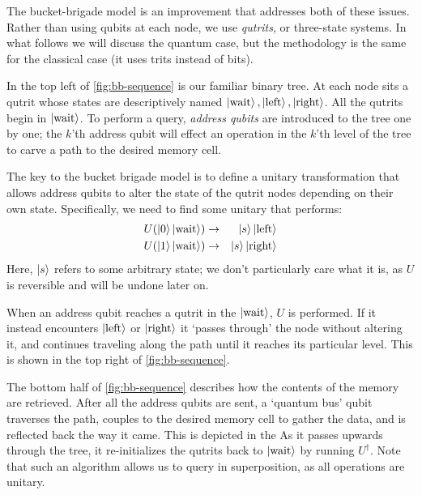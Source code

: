 \documentclass[a4paper,12pt]{article}
\begin{document}
{{The bucket-brigade model is an improvement that addresses both of these issues. Rather than using qubits at each node, we use \emph{qutrits}, or three-state systems. In what follows we will discuss the quantum case, but the methodology is the same for the classical case (it uses trits instead of bits).

In the top left of \autoref{fig:bb-sequence} is our familiar binary tree. At each node sits a qutrit whose states are descriptively named $\ket{\hbox{wait}}, \ket{\hbox{left}}, \ket{\hbox{right}}$. All the qutrits begin in $\ket{\hbox{wait}}$. To perform a query, \emph{address qubits} are introduced to the tree one by one; the $k$'th address qubit will effect an operation in the $k$'th level of the tree to carve a path to the desired memory cell.

The key to the bucket brigade model is to define a unitary transformation that allows address qubits to alter the state of the qutrit nodes depending on their own state. Specifically, we need to find some unitary that performs:
\begin{eqnarray}
 U(\ket{0}\ket{\hbox{wait}}) &\rightarrow& \ket{s}\ket{\hbox{left}} \\
 U(\ket{1}\ket{\hbox{wait}}) &\rightarrow& \ket{s}\ket{\hbox{right}}
\end{eqnarray}
Here, $\ket{s}$ refers to some arbitrary state; we don't particularly care what it is, as $U$ is reversible and will be undone later on.

When an address qubit reaches a qutrit in the $\ket{\hbox{wait}}$, $U$ is performed. If it instead encounters $\ket{\hbox{left}}$ or $\ket{\hbox{right}}$ it `passes through' the node without altering it, and continues traveling along the path until it reaches its particular level. This is shown in the top right of \autoref{fig:bb-sequence}.

The bottom half of \autoref{fig:bb-sequence} describes how the contents of the memory are retrieved. After all the address qubits are sent, a `quantum bus' qubit traverses the path, couples to the desired memory cell to gather the data, and is reflected back the way it came. This is depicted in the  As it passes upwards through the tree, it re-initializes the qutrits back to $\ket{\hbox{wait}}$ by running $U^\dag$. Note that such an algorithm allows us to query in superposition, as all operations are unitary.


}}
\end{document}

